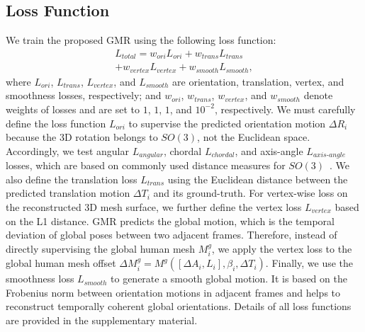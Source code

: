 \documentclass[10pt,twocolumn,letterpaper]{article}
\begin{document}
\subsection{Loss Function}
\label{subsection: loss function}

We train the proposed GMR using the following loss function:
\begin{equation}
\begin{split}
\label{eq: total loss function}
    L_{total}=w_{ori}L_{ori}+w_{trans}L_{trans}\\
    +w_{vertex}L_{vertex}+w_{smooth}L_{smooth},
\end{split}
\end{equation}
where $L_{ori}$, $L_{trans}$, $L_{vertex}$, and $L_{smooth}$ are orientation, translation, vertex, and smoothness losses, respectively; and $w_{ori}$, $w_{trans}$, $w_{vertex}$, and $w_{smooth}$ denote weights of losses and are set to $1$, $1$, $1$, and $10^{-2}$, respectively. We must carefully define the loss function $L_{ori}$ to supervise the predicted orientation motion $\Delta{R_{i}}$ because the 3D rotation belongs to $SO(3)$, not the Euclidean space. Accordingly, we test angular $L_{angular}$, chordal $L_{chordal}$, and axis-angle $L_{axis\text{-}angle}$ losses, which are based on commonly used distance measures for $SO(3)$~\cite{hartley2013rotation}. We also define the translation loss $L_{trans}$ using the Euclidean distance between the predicted translation motion $\Delta{T_{i}}$ and its ground-truth. For vertex-wise loss on the reconstructed 3D mesh surface, we further define the vertex loss $L_{vertex}$ based on the L1 distance. GMR predicts the global motion, which is the temporal deviation of global poses between two adjacent frames. Therefore, instead of directly supervising the global human mesh $M^{g}_{i}$, we apply the vertex loss to the global human mesh offset $\Delta{M}^{g}_{i}=M^{g}([\Delta{A}_{i},L_{i}],\beta_{i},\Delta{T}_{i})$. Finally, we use the smoothness loss $L_{smooth}$ to generate a smooth global motion. It is based on the Frobenius norm between orientation motions in adjacent frames and helps to reconstruct temporally coherent global orientations. Details of all loss functions are provided in the supplementary material.
\end{document}

